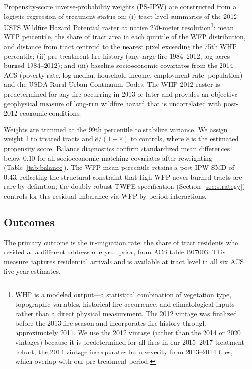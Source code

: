 \documentclass[12pt]{article}
\begin{document}
Propensity-score inverse-probability weights (PS-IPW) are constructed
from a logistic regression of treatment status on:
(i) tract-level summaries of the 2012 USFS Wildfire Hazard Potential
raster at native 270-meter resolution\footnote{WHP is a modeled output---a statistical combination of vegetation type,
topographic variables, historical fire occurrence, and climatological inputs---rather
than a direct physical measurement.
The 2012 vintage was finalized before the 2013 fire season and incorporates fire
history through approximately 2011.
We use the 2012 vintage (rather than the 2014 or 2020 vintages) because it is
predetermined for all fires in our 2015--2017 treatment cohort; the 2014 vintage
incorporates burn severity from 2013--2014 fires, which overlap with our
pre-treatment period.}: mean WFP percentile,
the share of tract area in each quintile of the WFP distribution,
and distance from tract centroid to the nearest pixel exceeding the
75th WHP percentile;
(ii) pre-treatment fire history (any large fire 1984--2012,
log acres burned 1984--2012);
and (iii) baseline socioeconomic covariates from the 2014 ACS
(poverty rate, log median household income, employment rate, population)
and the USDA Rural-Urban Continuum Codes.
The WHP 2012 raster is predetermined for any fire occurring in 2013
or later and provides an objective geophysical measure of
long-run wildfire hazard that is uncorrelated with post-2012
economic conditions.

Weights are trimmed at the 99th percentile to stabilize variance.
We assign weight 1 to treated tracts and $\hat{e} / (1 - \hat{e})$
to controls, where $\hat{e}$ is the estimated propensity score.
Balance diagnostics confirm standardized mean differences below 0.10
for all socioeconomic matching covariates after reweighting
(Table~\ref{tab:balance}).
The WFP mean percentile retains a post-IPW SMD of 0.43, reflecting the
structural constraint that high-WFP never-burned tracts are rare by
definition; the doubly robust TWFE specification (Section~\ref{sec:strategy})
controls for this residual imbalance via WFP-by-period interactions.

\subsection{Outcomes}

The primary outcome is the in-migration rate: the share of tract residents
who resided at a different address one year prior, from ACS table B07003.
This measure captures residential arrivals and is available at tract level
in all six ACS five-year estimates.
\end{document}
